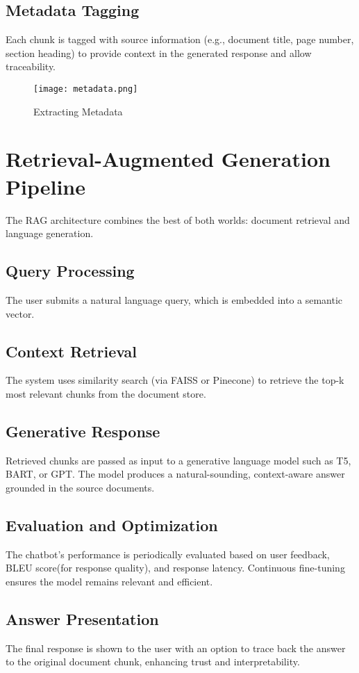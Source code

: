 \documentclass[12pt]{report}
\begin{document}
\subsection{Metadata Tagging}
Each chunk is tagged with source information (e.g., document title, page number, section heading) to provide context in the generated response and allow traceability.
\\
\begin{figure}[h]
    \centering
    \texttt{[image: metadata.png]}
    \caption{Extracting Metadata}
\end{figure}


\newpage
\section{Retrieval-Augmented Generation Pipeline}
The RAG architecture combines the best of both worlds: document retrieval and language generation. 

\subsection{Query Processing}
The user submits a natural language query, which is embedded into a semantic vector.

\subsection{Context Retrieval}
The system uses similarity search (via FAISS or Pinecone) to retrieve the top-k most relevant chunks from the document store.

\subsection{Generative Response}
Retrieved chunks are passed as input to a generative language model such as T5, BART, or GPT. The model produces a natural-sounding, context-aware answer grounded in the source documents.

\subsection{Evaluation and Optimization}
The chatbot's performance is periodically evaluated based on user feedback, BLEU score(for response quality), and response latency. Continuous fine-tuning ensures the model remains relevant and efficient.

\subsection{Answer Presentation}
The final response is shown to the user with an option to trace back the answer to the original document chunk, enhancing trust and interpretability.
\end{document}
